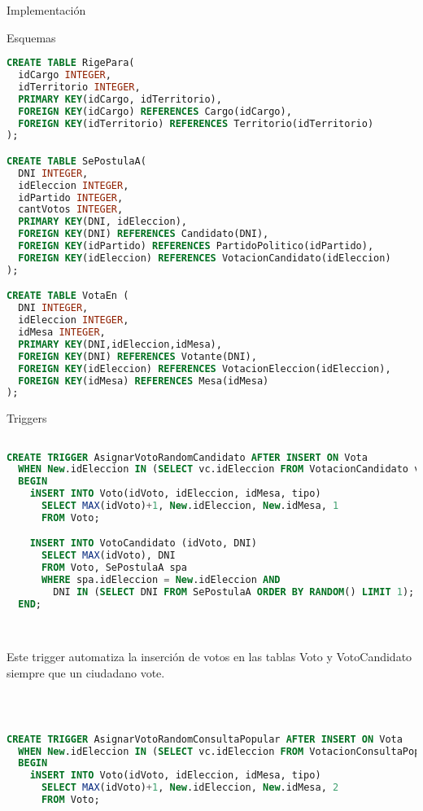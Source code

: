 \begin{section}{Implementaci\'on}
\begin{subsection}{Esquemas}
\begin{lstlisting}[language=SQL, basicstyle=\footnotesize]
CREATE TABLE RigePara(
  idCargo INTEGER,
  idTerritorio INTEGER,
  PRIMARY KEY(idCargo, idTerritorio),
  FOREIGN KEY(idCargo) REFERENCES Cargo(idCargo),
  FOREIGN KEY(idTerritorio) REFERENCES Territorio(idTerritorio)
);

CREATE TABLE SePostulaA(
  DNI INTEGER,
  idEleccion INTEGER,
  idPartido INTEGER,
  cantVotos INTEGER,
  PRIMARY KEY(DNI, idEleccion),
  FOREIGN KEY(DNI) REFERENCES Candidato(DNI),
  FOREIGN KEY(idPartido) REFERENCES PartidoPolitico(idPartido),
  FOREIGN KEY(idEleccion) REFERENCES VotacionCandidato(idEleccion)
);

CREATE TABLE VotaEn (
  DNI INTEGER, 
  idEleccion INTEGER, 
  idMesa INTEGER,   
  PRIMARY KEY(DNI,idEleccion,idMesa), 
  FOREIGN KEY(DNI) REFERENCES Votante(DNI), 
  FOREIGN KEY(idEleccion) REFERENCES VotacionEleccion(idEleccion), 
  FOREIGN KEY(idMesa) REFERENCES Mesa(idMesa)
);

\end{lstlisting} 
\end{subsection}

\begin{subsection}{Triggers}

\begin{lstlisting}[language=SQL, basicstyle=\footnotesize]

CREATE TRIGGER AsignarVotoRandomCandidato AFTER INSERT ON Vota
  WHEN New.idEleccion IN (SELECT vc.idEleccion FROM VotacionCandidato vc)
  BEGIN       
    iNSERT INTO Voto(idVoto, idEleccion, idMesa, tipo) 
      SELECT MAX(idVoto)+1, New.idEleccion, New.idMesa, 1
      FROM Voto;

    INSERT INTO VotoCandidato (idVoto, DNI)       
      SELECT MAX(idVoto), DNI 
      FROM Voto, SePostulaA spa
      WHERE spa.idEleccion = New.idEleccion AND 
        DNI IN (SELECT DNI FROM SePostulaA ORDER BY RANDOM() LIMIT 1);
  END;


\end{lstlisting} 

~

\noindent Este trigger automatiza la inserci\'on de votos en las tablas Voto y VotoCandidato siempre que un ciudadano vote.

~

\begin{lstlisting}[language=SQL, basicstyle=\footnotesize]

CREATE TRIGGER AsignarVotoRandomConsultaPopular AFTER INSERT ON Vota
  WHEN New.idEleccion IN (SELECT vc.idEleccion FROM VotacionConsultaPopular vc)
  BEGIN       
    iNSERT INTO Voto(idVoto, idEleccion, idMesa, tipo) 
      SELECT MAX(idVoto)+1, New.idEleccion, New.idMesa, 2 
      FROM Voto;


\end{lstlisting}
\end{subsection}
\end{section}
